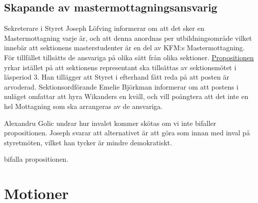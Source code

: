 \documentclass[hidelinks]{sektionsmote}
\begin{document}
\subsection{Skapande av mastermottagningsansvarig}
Sekreterare i Styret Joseph Löfving informerar om att det sker en Mastermottagning varje år, och att denna anordnas per utbildningsområde vilket innebär att sektionens masterstudenter är en del av KFM:s Mastermottagning.
För tillfället tillsätts de ansvariga på olika sätt från olika sektioner.
\hyperlink{bilagor/propmma.pdf.1}{Propositionen} yrkar istället på att sektionens representant ska tillsättas av sektionsmötet i läsperiod 3.
Han tillägger att Styret i efterhand fått reda på att posten är arvoderad.
Sektionsordförande Emelie Björkman informerar om att postens i nuläget omfattar att hyra Wikanders en kväll, och vill poängtera att det inte en hel Mottagning som ska arrangeras av de ansvariga.\par
Alexandru Golic undrar hur invalet kommer skötas om vi inte bifaller propositionen.
Joseph svarar att alternativet är att göra som innan med inval på styretmöten, vilket han tycker är mindre demokratiskt.

\begin{beslut}
  \item bifalla propositionen.
\end{beslut}

\section{Motioner}
\end{document}

